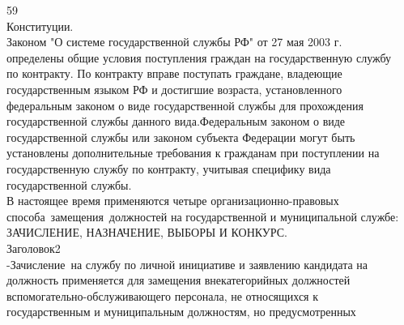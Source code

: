 \documentclass[14pt,a4paper]{extarticle}
\begin{document}
59 \\   \vspace{1em} Конституции. \\   \vspace{1em} Законом "О системе государственной службы РФ" от 27 мая 2003 г. \\   \vspace{1em} определены общие условия поступления граждан на государственную
службу \\   \vspace{1em} по контракту. По контракту вправе поступать граждане, владеющие \\   \vspace{1em} государственным языком РФ и достигшие возраста, установленного \\   \vspace{1em} федеральным законом о виде государственной службы для прохождения \\   \vspace{1em} государственной службы данного вида.Федеральным законом о виде \\   \vspace{1em} государственной службы или законом субъекта Федерации могут быть \\   \vspace{1em} установлены дополнительные требования к гражданам при поступлении
на \\   \vspace{1em} государственную службу по контракту, учитывая специфику вида \\   \vspace{1em} государственной службы. \\   \vspace{1em} В настоящее время применяются четыре организационно-правовых \\   \vspace{1em} способа замещения должностей на государственной и муниципальной
службе: \\   \vspace{1em} ЗАЧИСЛЕНИЕ, НАЗНАЧЕНИЕ, ВЫБОРЫ И КОНКУРС. \\   \vspace{1em} Заголовок2 \\   \vspace{1em} -Зачисление на службу по личной инициативе и заявлению кандидата
на \\   \vspace{1em} должность применяется для замещения внекатегорийных должностей \\   \vspace{1em} вспомогательно-обслуживающего персонала, не относящихся к \\   \vspace{1em} государственным и муниципальным должностям, но предусмотренных
\end{document}
